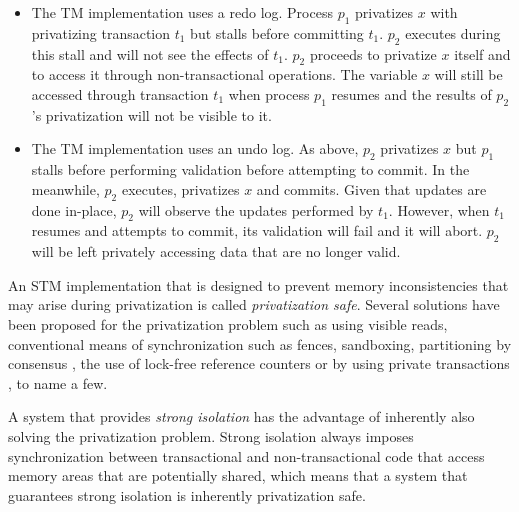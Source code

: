 \documentclass[11pt,letterpaper]{article}
\begin{document}
\begin{itemize}
\vspace{-0.1cm}
\item  
The TM implementation  uses a  redo log.  Process $p_1$ privatizes  $x$ with
privatizing transaction $t_1$ but stalls before committing $t_1$.  
$p_2$ executes during this stall and will not see the effects of $t_1$. 
$p_2$ proceeds to privatize $x$ itself and to access it through 
non-transactional operations. The variable $x$  will still be accessed through 
transaction $t_1$ when process $p_1$ resumes and the results of $p_2$'s 
privatization will not be visible to it. 
\vspace{-0.2cm}
\item The TM implementation uses an undo log. As above, $p_2$ privatizes 
$x$ but $p_1$ stalls before performing validation before attempting 
to commit. In the meanwhile, $p_2$ executes, privatizes $x$ and commits. 
Given that updates are done in-place, $p_2$ will observe the updates 
performed by $t_1$. However, when $t_1$ resumes and attempts to commit, 
its validation will fail and it will abort. $p_2$ will be left privately 
accessing data that are no longer valid.
\end{itemize}

An STM implementation that is designed to prevent memory inconsistencies 
that may arise during privatization is called {\it privatization 
safe}. Several solutions have been proposed for the privatization problem 
such as using visible reads, conventional means of synchronization 
such as fences, sandboxing, partitioning by consensus 
\cite{scott07}, the use of lock-free 
reference   counters   \cite{afek10}  or   by  using
private transactions \cite{dice10}, to name a few. 

A system that provides {\it strong isolation} has the advantage of
inherently also solving the privatization problem. 
Strong isolation always imposes synchronization between 
transactional and non-transactional code that access memory areas that 
are potentially shared, which means that a system that guarantees strong 
isolation is inherently privatization safe.
\end{document}
